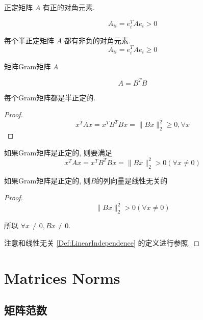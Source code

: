\begin{theorem}[正定矩阵对角元素性质]
    正定矩阵 $ A $ 有正的对角元素.

    $$
A_{i i}=e_{i}^{T} A e_{i}>0
$$
\end{theorem}

\begin{theorem}[半正定矩阵对角元素性质]
    每个半正定矩阵 $ A $ 都有非负的对角元素.
$$
A_{i i}=e_{i}^{T} A e_{i} \geq 0
$$
\end{theorem}

\begin{definition}[Gram矩阵]
    矩阵Gram矩阵 $ A $

    $$ A=B^{T} B $$
\end{definition}

\begin{theorem}
    每个Gram矩阵都是半正定的.
\end{theorem}

\begin{proof}
    $$ x^{T} A x=x^{T} B^{T} B x=\|B x\|_{2}^{2} \geq 0 , \forall x $$
\end{proof}

\begin{theorem}
    如果Gram矩阵是正定的, 则要满足
    $$ x^{T} A x=x^{T} B^{T} B x=\|B x\|_{2}^{2}>0 ( \forall x \neq 0) $$
\end{theorem}

\begin{corollary}
    如果Gram矩阵是正定的, 则$B$的列向量是线性无关的
\end{corollary}

\begin{proof}
    $$\|B x\|_{2}^{2}>0 ( \forall x \neq 0)$$

所以 $\forall x \neq 0, Bx \neq 0  $.

    注意和线性无关 \ref{Def:LinearIndependence} 的定义进行参照.
\end{proof}

\chapter{Matrices Norms}

\section{矩阵范数}

